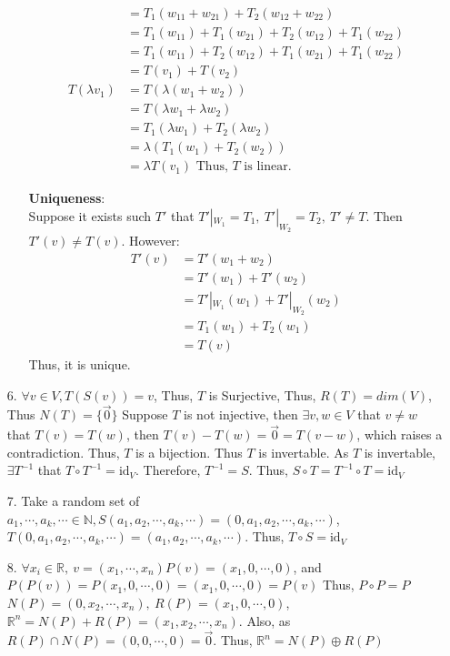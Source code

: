 \documentclass{article}
\begin{document}
\begin{itemize}
\begin{itemize}
\begin{align*}
                                &= T_1(w_{11}+w_{21})+T_2(w_{12}+w_{22})\\
                                &=T_1(w_{11})+T_1(w_{21})+T_2(w_{12})+T_1(w_{22})\\
                                &=T_1(w_{11})+T_2(w_{12})+T_1(w_{21})+T_1(w_{22})\\
                                &=T(v_1)+T(v_2)\\
                    T(\lambda v_1)& = T(\lambda(w_1+w_2))\\
                                &= T(\lambda w_1+\lambda w_2)\\
                                &=T_1(\lambda w_1)+T_2(\lambda w_2)\\
                                &=\lambda (T_1( w_1)+T_2(w_2))\\
                                &= \lambda T(v_1) \text{ \ \ \ \ Thus, \(T\) is linear.}
                \end{align*}
                
                \textbf{Uniqueness}:\\
                Suppose it exists such \(T'\) that \(T'|_{W_1}=T_1,\ T'|_{W_2} = T_2,\ T'\neq T\). Then \(T'(v)\neq T(v)\). 
                However:
                \begin{align*}
                    T'(v) &= T'(w_1+w_2)\\
                            &= T'(w_1)+T'(w_2)\\
                            &= T'|_{W_1}(w_1)+T'|_{W_2}(w_2)\\
                            &= T_1(w_1)+T_2(w_1)\\
                            &= T(v)
                \end{align*}
                Thus, it is unique.
\end{itemize}
\item [6.]\(\forall v\in V, T(S(v)) = v\), Thus, \(T\) is Surjective, Thus, \(R(T)=dim(V)\), Thus \(N(T)=\{\overrightarrow{0}\}\)
Suppose \(T\) is not injective, then \(\exists v,w \in V\) that \(v\neq w\) that \(T(v)=T(w)\), then \(T(v)-T(w)=\overrightarrow{0}=T(v-w)\), which raises a contradiction. Thus, \(T\) is a bijection. Thus \(T\) is invertable.
As \(T\) is invertable, \(\exists T^{-1}\) that \(T\circ T^{-1} = \text{id}_V\). Therefore, \(T^{-1} = S\). Thus, \(S\circ T = T^{-1}\circ T = \text{id}_V\)
\item [7.] Take a random set of \(a_1,\cdots,a_k,\cdots\in \mathbb{N}, S(a_1,a_2,\cdots,a_k,\cdots)=(0,a_1,a_2,\cdots,a_k,\cdots)\),
            \(T(0,a_1,a_2,\cdots,a_k,\cdots)=(a_1,a_2,\cdots,a_k,\cdots)\). Thus, \(T\circ S = \text{id}_V\)
\item [8.] \(\forall x_i\in\mathbb{R},\ v=(x_1,\cdots,x_n) P(v) = (x_1,0,\cdots,0) \), and \(P(P(v)) = P(x_1,0,\cdots,0) = (x_1,0,\cdots,0) = P(v)\)
Thus, \(P\circ P = P\)\\
\(N(P) = (0,x_2,\cdots,x_n),\ R(P) = (x_1,0,\cdots,0)\), \(\mathbb{R}^n = N(P)+R(P) = (x_1,x_2,\cdots,x_n)\). Also, as \(R(P)\cap N(P) = (0,0,\cdots,0)=\overrightarrow{0}\). Thus, \(\mathbb R ^n = N(P)\oplus R(P)\)
\end{itemize}
\end{document}

